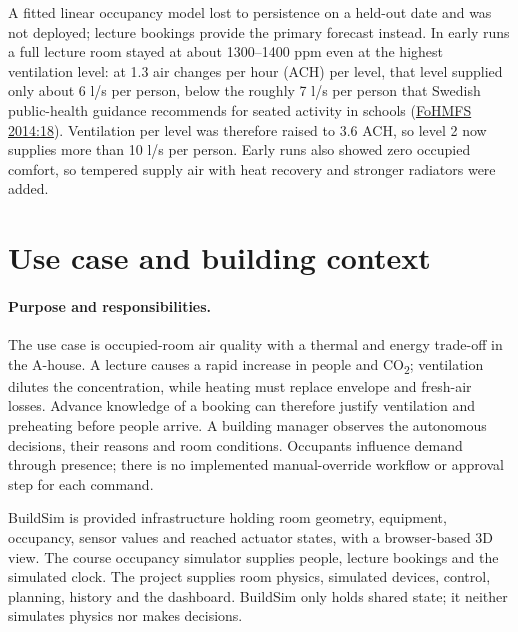 \documentclass[11pt,a4paper]{article}
\begin{document}
A fitted linear occupancy model lost to persistence on a held-out date and was not deployed; lecture bookings provide the primary forecast instead. In early runs a full lecture room stayed at about 1300--1400 ppm even at the highest ventilation level: at 1.3 air changes per hour (ACH) per level, that level supplied only about 6 l/s per person, below the roughly 7 l/s per person that Swedish public-health guidance recommends for seated activity in schools (\href{https://www.fohm.se/contentassets/641784832543443ea4eebe9b300c244e/fohmfs-2014-18.pdf}{FoHMFS 2014:18}). Ventilation per level was therefore raised to 3.6 ACH, so level 2 now supplies more than 10 l/s per person. Early runs also showed zero occupied comfort, so tempered supply air with heat recovery and stronger radiators were added.

\section{Use case and building context}
\paragraph{Purpose and responsibilities.}
The use case is occupied-room air quality with a thermal and energy trade-off in the A-house. A lecture causes a rapid increase in people and CO\textsubscript{2}; ventilation dilutes the concentration, while heating must replace envelope and fresh-air losses. Advance knowledge of a booking can therefore justify ventilation and preheating before people arrive. A building manager observes the autonomous decisions, their reasons and room conditions. Occupants influence demand through presence; there is no implemented manual-override workflow or approval step for each command.

BuildSim is provided infrastructure holding room geometry, equipment, occupancy, sensor values and reached actuator states, with a browser-based 3D view. The course occupancy simulator supplies people, lecture bookings and the simulated clock. The project supplies room physics, simulated devices, control, planning, history and the dashboard. BuildSim only holds shared state; it neither simulates physics nor makes decisions.

\end{document}
